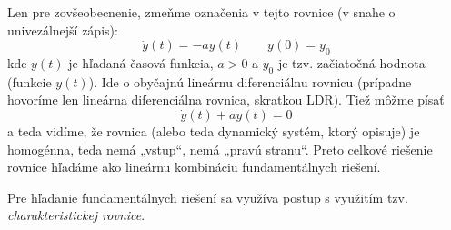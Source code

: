 \documentclass[a4paper, 10pt, ]{article}
\begin{document}
Len pre zovšeobecnenie, zmeňme označenia v tejto rovnice (v snahe o univezálnejší zápis):
\begin{equation} \label{prerobDR}
    \dot y(t) = -a y(t)  \qquad y(0) = y_0
\end{equation}
kde $y(t)$ je hľadaná časová funkcia, $a>0$ a $y_0$ je tzv. začiatočná hodnota (funkcie $y(t)$). Ide o obyčajnú lineárnu diferenciálnu rovnicu (prípadne hovoríme len lineárna diferenciálna rovnica, skratkou LDR). Tiež môžme písať
\begin{equation} \label{prerobDR2}
    \dot y(t) + a y(t) = 0
\end{equation}
a teda vidíme, že rovnica (alebo teda dynamický systém, ktorý opisuje) je homogénna, teda nemá „vstup“, nemá „pravú stranu“. Preto celkové riešenie rovnice hľadáme ako lineárnu kombináciu fundamentálnych riešení.

Pre hľadanie fundamentálnych riešení sa využíva postup s využitím tzv. \emph{charakteristickej rovnice}.

%
\end{document}
